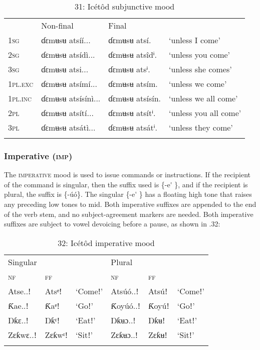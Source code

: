 \begin{table}
\caption{31: Icétôd subjunctive mood}
\label{tab:8}


\begin{tabularx}{\textwidth}{XXXX} & Non-final & Final & \\
\lsptoprule
\textsc{1sg} & ɗɛmʉsʉ atsíí... & ɗɛmʉsʉ atsí. & ‘unless I come’\\
\textsc{2sg} & ɗɛmʉsʉ atsídì... & ɗɛmʉsʉ atsîdⁱ. & ‘unless you come’\\
\textsc{3sg} & ɗɛmʉsʉ atsi... & ɗɛmʉsʉ atsⁱ. & ‘unless she comes’\\
\textsc{1pl.exc} & ɗɛmʉsʉ atsímí... & ɗɛmʉsʉ atsím. & ‘unless we come’\\
\textsc{1pl.inc} & ɗɛmʉsʉ atsísínì... & ɗɛmʉsʉ atsísín. & ‘unless we all come’\\
\textsc{2pl} & ɗɛmʉsʉ atsítí... & ɗɛmʉsʉ atsítⁱ. & ‘unless you all come’\\
\textsc{3pl} & ɗɛmʉsʉ atsátì... & ɗɛmʉsʉ atsátⁱ. & ‘unless they come’\\
\lspbottomrule
\end{tabularx}
\end{table}

\subsubsection{Imperative (\textsc{imp})}

The \textsc{imperative} mood is used to issue commands or instructions. If the recipient of the command is singular, then the suffix used is \{-e\'{} \}, and if the recipient is plural, the suffix is \{-úó\}. The singular \{-e\'{} \} has a floating high tone that raises any preceding low tones to mid. Both imperative suffixes are appended to the end of the verb stem, and no subject-agreement markers are needed. Both imperative suffixes are subject to vowel devoicing before a pause, as shown in .32:


\begin{table}
\caption{32: Icétôd imperative mood}
\label{tab:8}


\begin{tabularx}{\textwidth}{XXXXXX}
\lsptoprule

Singular &  &  & Plural &  & \\
\textsc{nf} & \textsc{ff} &  & \textsc{nf} & \textsc{ff} & \\
Atse..ǃ & Atsᵉǃ & ‘Comeǃ’ & Atsúó..ǃ & Atsúǃ & ‘Comeǃ’\\
Ƙae..ǃ & Ƙaᵉǃ & ‘Goǃ’ & Ƙoyúó..ǃ & Ƙoyúǃ & ‘Goǃ’\\
Ŋƙɛ..ǃ & Ŋƙᵋǃ & ‘Eatǃ’ & Ŋƙʉɔ..ǃ & Ŋƙʉǃ & ‘Eatǃ’\\
Zɛƙwɛ..ǃ & Zɛƙwᵋǃ & ‘Sitǃ’ & Zɛƙʉɔ..ǃ & Zɛƙʉǃ & ‘Sitǃ’\\
\lspbottomrule
\end{tabularx}
\end{table}

